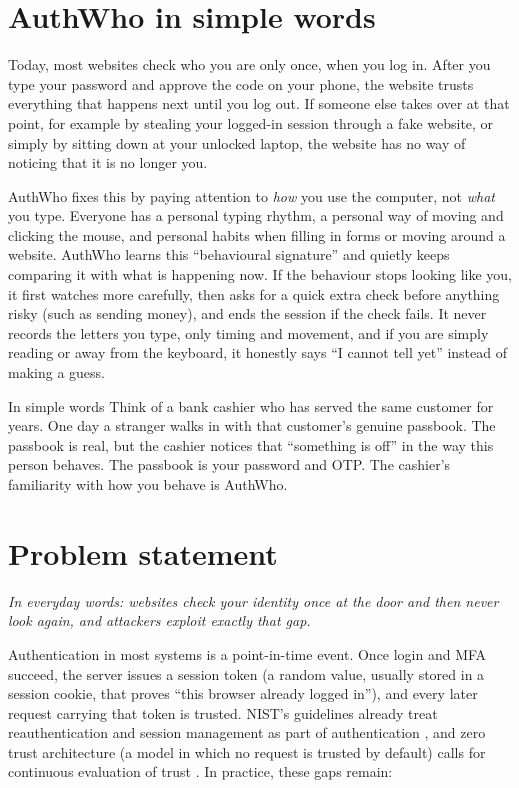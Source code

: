 \documentclass[10pt,letterpaper]{article}
\begin{document}
\section{AuthWho in simple words}

Today, most websites check who you are only once, when you log in. After you type your password and approve the code on your phone, the website trusts everything that happens next until you log out. If someone else takes over at that point, for example by stealing your logged-in session through a fake website, or simply by sitting down at your unlocked laptop, the website has no way of noticing that it is no longer you.

AuthWho fixes this by paying attention to \emph{how} you use the computer, not \emph{what} you type. Everyone has a personal typing rhythm, a personal way of moving and clicking the mouse, and personal habits when filling in forms or moving around a website. AuthWho learns this ``behavioural signature'' and quietly keeps comparing it with what is happening now. If the behaviour stops looking like you, it first watches more carefully, then asks for a quick extra check before anything risky (such as sending money), and ends the session if the check fails. It never records the letters you type, only timing and movement, and if you are simply reading or away from the keyboard, it honestly says ``I cannot tell yet'' instead of making a guess.

\begin{callout}{In simple words}
Think of a bank cashier who has served the same customer for years. One day a stranger walks in with that customer's genuine passbook. The passbook is real, but the cashier notices that ``something is off'' in the way this person behaves. The passbook is your password and OTP. The cashier's familiarity with how you behave is AuthWho.
\end{callout}

\section{Problem statement}

\emph{In everyday words: websites check your identity once at the door and then never look again, and attackers exploit exactly that gap.}

Authentication in most systems is a point-in-time event. Once login and MFA succeed, the server issues a session token (a random value, usually stored in a session cookie, that proves ``this browser already logged in''), and every later request carrying that token is trusted. NIST's guidelines already treat reauthentication and session management as part of authentication \cite{nist80063b}, and zero trust architecture (a model in which no request is trusted by default) calls for continuous evaluation of trust \cite{nist800207}. In practice, these gaps remain:
\end{document}
